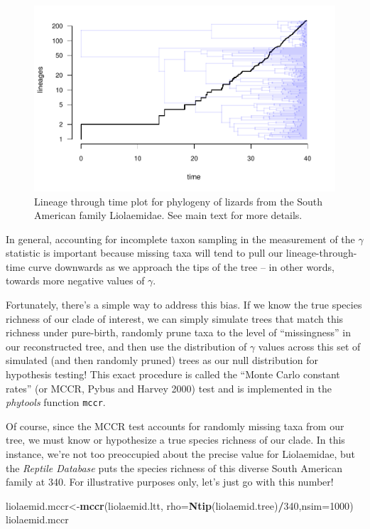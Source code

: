 \documentclass[fleqn,10pt,lineno]{wlpeerj} %
\newenvironment{Shaded}{\begin{snugshade}}{\end{snugshade}}
\newcommand{\AttributeTok}[1]{\textcolor[rgb]{0.13,0.29,0.53}{#1}}
\newcommand{\DecValTok}[1]{\textcolor[rgb]{0.00,0.00,0.81}{#1}}
\newcommand{\FunctionTok}[1]{\textcolor[rgb]{0.13,0.29,0.53}{\textbf{#1}}}
\newcommand{\NormalTok}[1]{#1}
\newcommand{\OtherTok}[1]{\textcolor[rgb]{0.56,0.35,0.01}{#1}}
\newcommand{\SpecialCharTok}[1]{\textcolor[rgb]{0.81,0.36,0.00}{\textbf{#1}}}
\begin{document}
\begin{figure}
\includegraphics[width=1\linewidth]{Revell.phytools-v2_peerj_files/figure-latex/liol-ltt-1} \caption{Lineage through time plot for phylogeny of lizards from the South American family Liolaemidae. See main text for more details.}\label{fig:liol-ltt}
\end{figure}

In general, accounting for incomplete taxon sampling in the measurement of the \(\gamma\) statistic is important because missing taxa will tend to pull our lineage-through-time curve downwards as we approach the tips of the tree -- in other words, towards more negative values of \(\gamma\).

Fortunately, there's a simple way to address this bias. If we know the true species richness of our clade of interest, we can simply simulate trees that match this richness under pure-birth, randomly prune taxa to the level of ``missingness'' in our reconstructed tree, and then use the distribution of \(\gamma\) values across this set of simulated (and then randomly pruned) trees as our null distribution for hypothesis testing! This exact procedure is called the ``Monte Carlo constant rates'' (or MCCR, Pybus and Harvey 2000) test and is implemented in the \emph{phytools} function \texttt{mccr}.

Of course, since the MCCR test accounts for randomly missing taxa from our tree, we must know or hypothesize a true species richness of our clade. In this instance, we're not too preoccupied about the precise value for Liolaemidae, but the \emph{Reptile Database} puts the species richness of this diverse South American family at 340. For illustrative purposes only, let's just go with this number!

\begin{Shaded}
\begin{Highlighting}[]
\NormalTok{liolaemid.mccr}\OtherTok{\textless{}{-}}\FunctionTok{mccr}\NormalTok{(liolaemid.ltt,}
  \AttributeTok{rho=}\FunctionTok{Ntip}\NormalTok{(liolaemid.tree)}\SpecialCharTok{/}\DecValTok{340}\NormalTok{,}\AttributeTok{nsim=}\DecValTok{1000}\NormalTok{)}
\NormalTok{liolaemid.mccr}
\end{Highlighting}
\end{Shaded}
\end{document}
